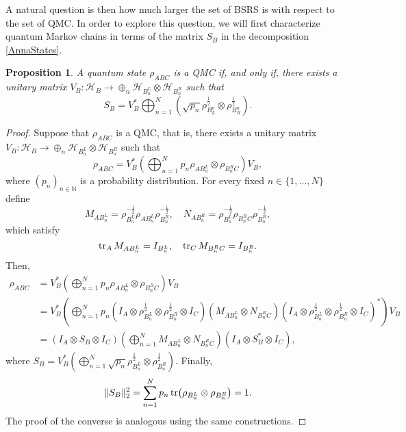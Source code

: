 \documentclass[11pt]{article}
\theoremstyle{newdefinition}
\theoremstyle{newplain}
\newtheorem{proposition}[definition]{Proposition}
\theoremstyle{myplain}
\DeclareMathOperator{\1}{\mathds{1}}
\newcommand{\PCR}[1]{{\color{blue}#1}}
\begin{document}
A natural question is then  how much larger the set of BSRS is with respect to the set of QMC. In order to explore this question, we will first characterize quantum Markov chains in terms of the matrix $S_B$ in the decomposition \eqref{AnnaStates}.

\begin{proposition}\label{prop:StructureQMC}
    A quantum state  $\rho_{ABC}$ is a QMC if, and only if,  there exists a unitary \PCR{matrix $V_B:\mathcal {H}_B\to \oplus_n \mathcal {H}_{B^L_n}\otimes \mathcal{H}_{B^R_n}$ such that 
    \begin{equation}
        S_B=V_B^*\bigoplus_{n=1}^N\left(\sqrt{p_n}\rho_{B_L^n}^{\frac{1}{2}}\otimes\rho_{B_R^n}^{\frac{1}{2}} \right).
    \end{equation} }
\end{proposition}
\begin{proof}
    Suppose that $\rho_{ABC}$ is a QMC, that is, there exists a unitary \PCR{matrix $V_B:\mathcal {H}_B\to \oplus_n \mathcal {H}_{B^L_n}\otimes \mathcal{H}_{B^R_n}$} such that
    \begin{equation}
        \rho_{ABC}=V_B^* \left(\bigoplus_{n=1}^N p_n \rho_{AB_{n}^L}\otimes \rho_{B_{n}^RC} \right) V_B,
    \end{equation}
    where $(p_n)_{n \in \mathbb{N}}$ is a probability distribution. For every fixed $n \in \{1, \hdots,N\}$ define
    \begin{equation}
        M_{AB_n^L}=\rho_{B_n^L}^{-\frac{1}{2}}\rho_{AB_n^L}\rho_{B_n^R}^{-\frac{1}{2}}, \quad  N_{AB_n^R}=\rho_{B_n^L}^{-\frac{1}{2}}\rho_{B_n^RC}\rho_{B_n^R}^{-\frac{1}{2}},
    \end{equation}
which satisfy
\begin{equation}
    \tr_A M_{AB_n^L}=I_{B_n^L}, \quad   \tr_C M_{B_n^R C}=I_{B_n^R}.
\end{equation}
Then,
\begin{subequations}
\begin{align}
        \rho_{ABC}&=V_B^*\left(\bigoplus_{n=1}^N p_n \rho_{A B_{n}^L}\otimes \rho_{B_{n}^R C}\right)V_B\\
        &=V_B^* \left(\bigoplus_{n=1}^N p_n (I_A \otimes \rho_{B_n^L}^{\frac{1}{2}}\otimes \rho_{B_n^R}^{\frac{1}{2}} \otimes I_C)(M_{AB_n^L} \otimes N_{B_n^R C})(I_A \otimes \rho_{B_n^L}^{\frac{1}{2}}\otimes \rho_{B_n^R}^{\frac{1}{2}}  \otimes I_C)^* \right)V_B\\
        &=(I_A \otimes S_B \otimes I_C)\left(\bigoplus_{n=1}^N M_{AB_n^L} \otimes N_{B_n^R C} \right)(I_A\otimes S_B^*\otimes I_C),
\end{align}
\end{subequations}
where $S_B=\displaystyle V_B^*\left( \bigoplus_{n=1}^N \sqrt{p_n} \rho_{B_n^L}^{\frac{1}{2}}\otimes \rho_{B_n^R}^{\frac{1}{2}}\right)$. Finally,
\begin{equation}
    \Vert S_B \Vert_2^2=\sum_{n=1}^N p_n \tr(\rho_{B_n^L}\otimes \rho_{B_n^R})=1.
\end{equation}
The proof of the  converse is analogous using the same constructions.

\end{proof}
\end{document}
